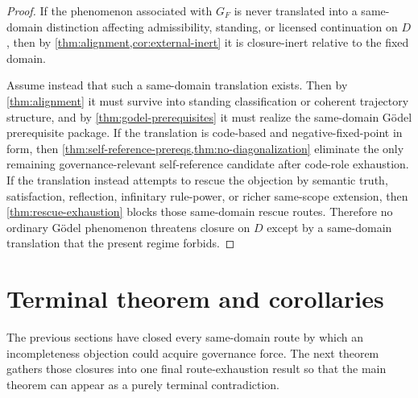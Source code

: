 \documentclass[11pt]{article}
\theoremstyle{plain}
\theoremstyle{definition}
\newcommand{\domain}{D}
\begin{document}
\begin{proof}
If the phenomenon associated with $G_F$ is never translated into a same-domain distinction affecting admissibility, standing, or licensed continuation on $\domain$, then by \cref{thm:alignment,cor:external-inert} it is closure-inert relative to the fixed domain.

Assume instead that such a same-domain translation exists. Then by \cref{thm:alignment} it must survive into standing classification or coherent trajectory structure, and by \cref{thm:godel-prerequisites} it must realize the same-domain G\"odel prerequisite package. If the translation is code-based and negative-fixed-point in form, then \cref{thm:self-reference-prereqs,thm:no-diagonalization} eliminate the only remaining governance-relevant self-reference candidate after code-role exhaustion. If the translation instead attempts to rescue the objection by semantic truth, satisfaction, reflection, infinitary rule-power, or richer same-scope extension, then \cref{thm:rescue-exhaustion} blocks those same-domain rescue routes. Therefore no ordinary G\"odel phenomenon threatens closure on $\domain$ except by a same-domain translation that the present regime forbids.
\end{proof}

\section{Terminal theorem and corollaries}
\label{sec:main}

The previous sections have closed every same-domain route by which an incompleteness objection could acquire governance force. The next theorem gathers those closures into one final route-exhaustion result so that the main theorem can appear as a purely terminal contradiction.
\end{document}
